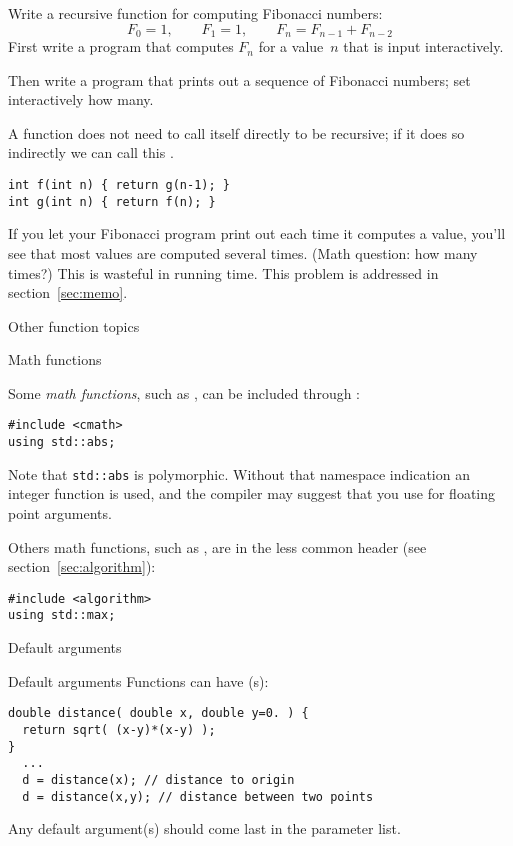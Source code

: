 \begin{exercise}
  \label{ex:recur-fib}
  Write a recursive function for computing Fibonacci numbers:
  \[ F_0=1,\qquad F_1=1,\qquad F_{n}=F_{n-1}+F_{n-2} \]
  First write a program that computes $F_n$ for a value~$n$ that is
  input interactively.

  Then write a program that prints out a sequence of Fibonacci
  numbers; set interactively how many.
\end{exercise}

\begin{remark}
  A function does not need to call itself directly to be recursive; if
  it does so indirectly we can call this .
\begin{lstlisting}
int f(int n) { return g(n-1); }
int g(int n) { return f(n); }
\end{lstlisting}
\end{remark}

\begin{remark}
  If you let your Fibonacci program print out each time it computes a
  value, you'll see that most values are computed several times. (Math
  question: how many times?) This is wasteful in running time. This
  problem is addressed in section~\ref{sec:memo}.
\end{remark}

 {Other function topics}

 {Math functions}
\label{sec:cmath}

Some \emph{math functions},
such as ,
can be included through :
\begin{lstlisting}
#include <cmath>
using std::abs;
\end{lstlisting}
Note that \lstinline+std::abs+ is polymorphic.
Without that namespace indication
an integer function  is used,
and the compiler may suggest that you use 
for floating point arguments.

Others math functions, such as ,
are in the less common  header
(see section~\ref{sec:algorithm}):
\begin{lstlisting}
#include <algorithm>
using std::max;
\end{lstlisting}


 {Default arguments}

\begin{block}{Default arguments}
  \label{sl:def-arg}
  Functions can have (s):
\begin{lstlisting}
double distance( double x, double y=0. ) {
  return sqrt( (x-y)*(x-y) );
}
  ...
  d = distance(x); // distance to origin
  d = distance(x,y); // distance between two points
\end{lstlisting}
Any default argument(s) should come last in the parameter list.
\end{block}

